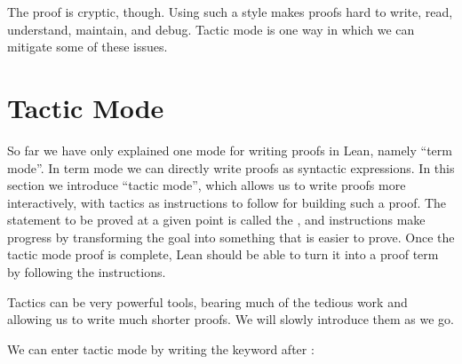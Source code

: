 \documentclass[letterpaper,10pt,english]{sphinxmanual}
\begin{document}
\sphinxAtStartPar
The proof is cryptic, though.
Using such a style makes proofs hard to write, read, understand, maintain, and debug.
Tactic mode is one way in which we can mitigate some of these issues.


\section{Tactic Mode}
\label{\detokenize{propositional_logic_in_lean:tactic-mode}}
\sphinxAtStartPar
So far we have only explained one mode for writing proofs in Lean,
namely “term mode”.
In term mode we can directly write proofs as syntactic expressions.
In this section we introduce “tactic mode”,
which allows us to write proofs more interactively,
with tactics as instructions to follow for building such a proof.
The statement to be proved at a given point is called the ,
and instructions make progress by transforming
the goal into something that is easier to prove.
Once the tactic mode proof is complete,
Lean should be able to turn it into a proof term by following the instructions.

\sphinxAtStartPar
Tactics can be very powerful tools,
bearing much of the tedious work and
allowing us to write much shorter proofs.
We will slowly introduce them as we go.

\sphinxAtStartPar
We can enter tactic mode by writing the keyword  after \sphinxcode{\sphinxupquote{:=}}:
\end{document}
